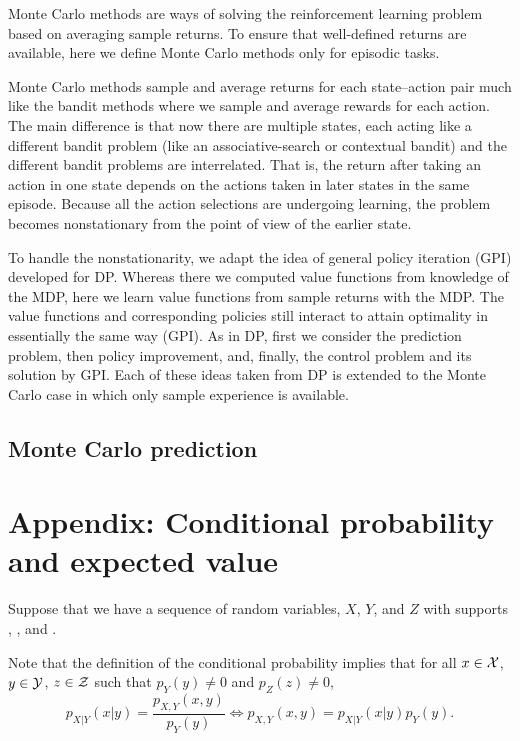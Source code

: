 Monte Carlo methods are ways of solving the reinforcement learning problem based on averaging sample returns.
To ensure that well-defined returns are available, here we define Monte Carlo methods only for episodic tasks. 

Monte Carlo methods sample and average returns for each state–action pair much like the bandit methods
where we sample and average rewards for each action.
The main difference is that now there are multiple states,
each acting like a different bandit problem (like an associative-search or contextual bandit)
and the different bandit problems are interrelated.
That is, the return after taking an action in one state depends on the actions taken in later states in the same episode.
Because all the action selections are undergoing learning, the problem becomes nonstationary from the point of view of the earlier state. 


To handle the nonstationarity,
we adapt the idea of general policy iteration (GPI) developed for DP.
Whereas there we computed value functions from knowledge of the MDP,
here we learn value functions from sample returns with the MDP.
The value functions and corresponding policies still interact to attain optimality 
in essentially the same way (GPI).
As in DP,
first we consider the prediction problem, then policy improvement, and, finally,
the control problem and its solution by GPI.
Each of these ideas taken from DP is extended to the Monte Carlo case in which only sample experience is available. 


\subsection{Monte Carlo prediction}







\newpage
\section{Appendix: Conditional probability and expected value}
\label{sec:rl-app}


Suppose that we have a sequence of random variables, $X$, $Y$, and $Z$
with supports \suppx, \suppy, and \suppz.

Note that the definition of the conditional probability implies that
for all $x\in\mathcal{X}$, $y\in\mathcal{Y}$, $z\in\mathcal{Z}$ such that $p_Y(y)\neq0$ and $p_Z(z)\neq 0$,
\begin{equation}
\label{eq:vusg-1}
p_{X|Y}(x|y)
= \frac{p_{X,Y}(x,y)}{p_Y(y)}
\Leftrightarrow
p_{X,Y}(x,y) = p_{X|Y}(x|y) p_Y(y).
\end{equation}



